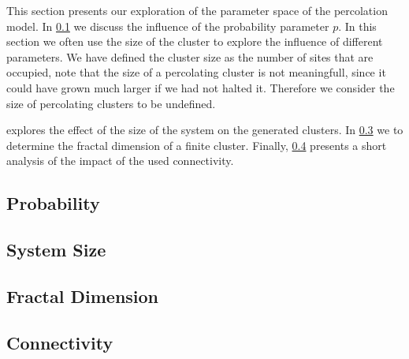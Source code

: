 This section presents our exploration of the parameter space of the percolation model. In \cref{ss:exp:probability} we discuss the influence of the probability parameter $p$. In this section we often use the size of the cluster to explore the influence of different parameters. We have defined the cluster size as the number of sites that are occupied, note that the size of a percolating cluster is not meaningfull, since it could have grown much larger if we had not halted it. Therefore we consider the size of percolating clusters to be undefined.

 explores the effect of the size of the system on the generated clusters. In \cref{ss:exp:fractal} we to determine the fractal dimension of a finite cluster. Finally, \cref{ss:exp:connectivity} presents a short analysis of the impact of the used connectivity.

\subsection{Probability}
\label{ss:exp:probability}


\subsection{System Size}
\label{ss:exp:systemSize}


\subsection{Fractal Dimension}
\label{ss:exp:fractal}
	

\subsection{Connectivity}
\label{ss:exp:connectivity}

